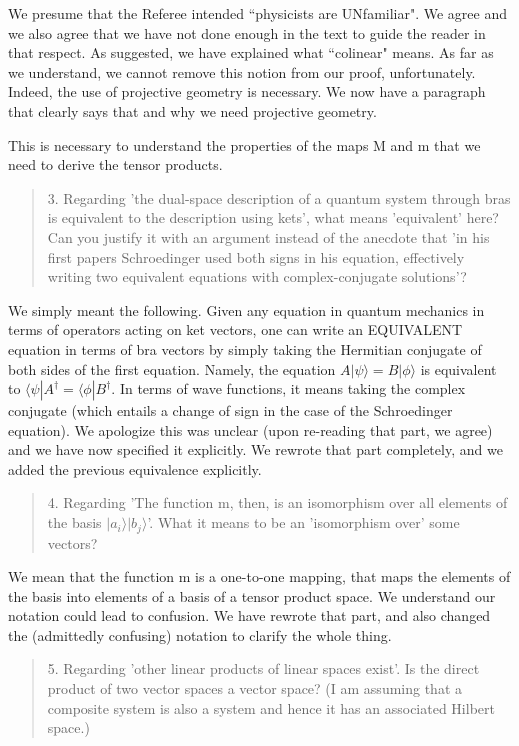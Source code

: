 \documentclass[11pt]{article}
\def\>{\rangle}
\def\<{\langle}
\begin{document}
We presume that the Referee intended ``physicists are UNfamiliar".  We
agree and we also agree that we have not done enough in the text to
guide the reader in that respect. As suggested, we have explained what
``colinear" means. As far as we understand, we cannot remove this
notion from our proof, unfortunately. Indeed, the use of projective
geometry is necessary. We now have a paragraph that clearly says that
and why we need projective geometry.

This is necessary to understand the properties of the maps M and m
that we need to derive the tensor products.

\begin{quote}
3. Regarding 'the dual-space description of a quantum
system through bras is equivalent to the description using kets', what
means 'equivalent' here? Can you justify it with an argument instead
of the anecdote that 'in his first papers Schroedinger used both signs
in his equation, effectively writing two equivalent equations with
complex-conjugate solutions'?
\end{quote}

We simply meant the following. Given any equation in quantum mechanics
in terms of operators acting on ket vectors, one can write an
EQUIVALENT equation in terms of bra vectors by simply taking the
Hermitian conjugate of both sides of the first equation. Namely, the
equation $A|\psi\>=B|\phi\>$ is equivalent to $\<\psi|A^\dag=\<\phi|B^\dag$. In
terms of wave functions, it means taking the complex conjugate (which
entails a change of sign in the case of the Schroedinger equation). We
apologize this was unclear (upon re-reading that part, we agree) and
we have now specified it explicitly. We rewrote that part completely,
and we added the previous equivalence explicitly.

\begin{quote}
4. Regarding 'The function m, then, is an isomorphism over
all elements of the basis $|a_i\>|b_j\>$'. What it means to be an
'isomorphism over' some vectors?
\end{quote}

We mean that the function m is a one-to-one mapping, that maps the
elements of the basis into elements of a basis of a tensor product
space. We understand our notation could lead to confusion. We have
rewrote that part, and also changed the (admittedly confusing)
notation to clarify the whole thing.

\begin{quote}
5. Regarding 'other linear products of linear spaces
exist'. Is the direct product of two vector spaces a vector space? (I
am assuming that a composite system is also a system and hence it has
an associated Hilbert space.)
\end{quote}
\end{document}
